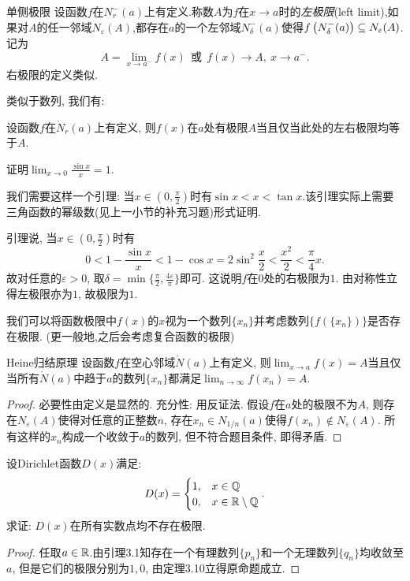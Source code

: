 \begin{definition}{单侧极限}
	设函数$f$在$N_{r}^{-}(a)$上有定义.称数$A$为$f$在$x\to a$时的\textit{左极限}(left limit),如果对$A$的任一邻域$N_{\varepsilon}(A)$,都存在$a$的一个左邻域$N_{\delta}^{-}(a)$使得$f\left( N_{\delta}^{-}(a) \right) \subseteq N_{\varepsilon}(A)$.记为$$A = \lim_{x \to a^-} f(x) ~~ \text{或} ~~ f(x) \to A,~x \to a^{-}.$$
	右极限的定义类似.
\end{definition}

类似于数列, 我们有: 

\begin{proposition}{}
	设函数$f$在$\mathring{N}_{r}(a)$上有定义, 则$f(x)$在$a$处有极限$A$当且仅当此处的左右极限均等于$A$.
\end{proposition}

\begin{example}
	证明$\lim_{x\to 0} \frac{\sin x}{x}=1$.
\end{example}
\begin{solution}
	我们需要这样一个引理: 当$x\in (0,\frac{\pi}{2})$时有$\sin x < x < \tan x$.该引理实际上需要三角函数的幂级数(见上一小节的补充习题)形式证明.
	
	引理说, 当$x \in (0,\frac{\pi}{2})$时有$$0<1-\frac{\sin x}{x} < 1-\cos x = 2\sin^2 \frac{x}{2} < \frac{x^2}{2} < \frac{\pi}{4} x.$$
	故对任意的$\varepsilon >0$, 取$\delta = \min \{ \frac{\pi}{2},\frac{4\varepsilon}{\pi} \}$即可. 这说明$f$在$0$处的右极限为$1$. 由对称性立得左极限亦为$1$, 故极限为$1$. 
\end{solution}


我们可以将函数极限中$f(x)$的$x$视为一个数列$\{ x_n \}$并考虑数列$\{ f(\{ x_n \}) \}$是否存在极限. (更一般地,之后会考虑复合函数的极限)

\begin{theorem}{Heine归结原理}
	设函数$f$在空心邻域$\mathring{N}(a)$上有定义, 则$\lim_{x\to a} f(x)=A$当且仅当所有$\mathring{N}(a)$中趋于$a$的数列$\{ x_n \}$都满足$\lim_{n\to \infty} f(x_n) =A$.
\end{theorem}
\begin{proof}
	必要性由定义是显然的. 充分性: 用反证法. 假设$f$在$a$处的极限不为$A$, 则存在$N_{\varepsilon}(A)$使得对任意的正整数$n$, 存在$x_n \in N_{1/n}(a)$使得$f(x_n) \notin N_{\varepsilon}(A)$. 所有这样的$x_n$构成一个收敛于$a$的数列, 但不符合题目条件, 即得矛盾. 
\end{proof}

\begin{example}
	设Dirichlet函数$D(x)$满足: $$D(x) = \begin{cases}
		1,&x\in \mathbb{Q} \\ 0,& x \in \mathbb{R} \setminus \mathbb{Q}
	\end{cases}.$$
	求证: $D(x)$在所有实数点均不存在极限. 
\end{example}
\begin{proof}
	任取$a \in \mathbb{R}$.由引理3.1知存在一个有理数列$\{ p_n \}$和一个无理数列$\{ q_n \}$均收敛至$a$, 但是它们的极限分别为$1,0$, 由定理3.10立得原命题成立. 
\end{proof}

